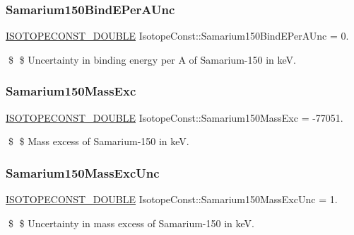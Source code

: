 \subsubsection{\texorpdfstring{Samarium150\+Bind\+E\+Per\+A\+Unc}{Samarium150BindEPerAUnc}}
{\footnotesize\ttfamily \mbox{\hyperlink{group___isotope_const-_macros_ga8f45a7272ce02c0b4c65c44636ed719a}{I\+S\+O\+T\+O\+P\+E\+C\+O\+N\+S\+T\+\_\+\+D\+O\+U\+B\+LE}} Isotope\+Const\+::\+Samarium150\+Bind\+E\+Per\+A\+Unc = 0.}

\$ \$ Uncertainty in binding energy per A of Samarium-\/150 in keV. \mbox{\label{group___isotope_const-_samarium-_sm150_ga59836e60f4badb09ab5e5867d63c3cca}} 
\subsubsection{\texorpdfstring{Samarium150\+Mass\+Exc}{Samarium150MassExc}}
{\footnotesize\ttfamily \mbox{\hyperlink{group___isotope_const-_macros_ga8f45a7272ce02c0b4c65c44636ed719a}{I\+S\+O\+T\+O\+P\+E\+C\+O\+N\+S\+T\+\_\+\+D\+O\+U\+B\+LE}} Isotope\+Const\+::\+Samarium150\+Mass\+Exc = -\/77051.}

\$ \$ Mass excess of Samarium-\/150 in keV. \mbox{\label{group___isotope_const-_samarium-_sm150_ga15b6a7ed12fabb5abc553790138792c6}} 
\subsubsection{\texorpdfstring{Samarium150\+Mass\+Exc\+Unc}{Samarium150MassExcUnc}}
{\footnotesize\ttfamily \mbox{\hyperlink{group___isotope_const-_macros_ga8f45a7272ce02c0b4c65c44636ed719a}{I\+S\+O\+T\+O\+P\+E\+C\+O\+N\+S\+T\+\_\+\+D\+O\+U\+B\+LE}} Isotope\+Const\+::\+Samarium150\+Mass\+Exc\+Unc = 1.}

\$ \$ Uncertainty in mass excess of Samarium-\/150 in keV. \mbox{\label{group___isotope_const-_samarium-_sm150_ga27a3d73e82862a8b7be2c887838cef5e}} 
